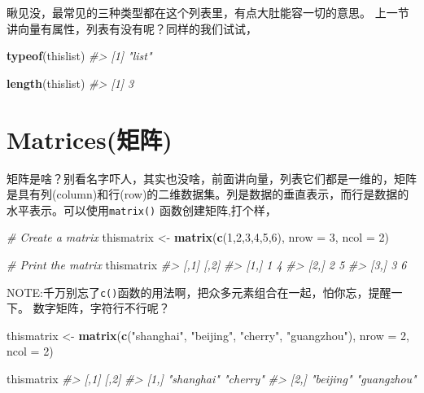 \documentclass[
]{book}
\newenvironment{Shaded}{\begin{snugshade}}{\end{snugshade}}
\newcommand{\AttributeTok}[1]{\textcolor[rgb]{0.13,0.29,0.53}{#1}}
\newcommand{\CommentTok}[1]{\textcolor[rgb]{0.56,0.35,0.01}{\textit{#1}}}
\newcommand{\DecValTok}[1]{\textcolor[rgb]{0.00,0.00,0.81}{#1}}
\newcommand{\FunctionTok}[1]{\textcolor[rgb]{0.13,0.29,0.53}{\textbf{#1}}}
\newcommand{\NormalTok}[1]{#1}
\newcommand{\OtherTok}[1]{\textcolor[rgb]{0.56,0.35,0.01}{#1}}
\newcommand{\StringTok}[1]{\textcolor[rgb]{0.31,0.60,0.02}{#1}}
\begin{document}
瞅见没，最常见的三种类型都在这个列表里，有点大肚能容一切的意思。
上一节讲向量有属性，列表有没有呢？同样的我们试试，

\begin{Shaded}
\begin{Highlighting}[]
\FunctionTok{typeof}\NormalTok{(thislist)}
\CommentTok{\#\textgreater{} [1] "list"}
\end{Highlighting}
\end{Shaded}

\begin{Shaded}
\begin{Highlighting}[]
\FunctionTok{length}\NormalTok{(thislist)}
\CommentTok{\#\textgreater{} [1] 3}
\end{Highlighting}
\end{Shaded}

\hypertarget{matricesux77e9ux9635}{%
\section{Matrices(矩阵)}\label{matricesux77e9ux9635}}

矩阵是啥？别看名字吓人，其实也没啥，前面讲向量，列表它们都是一维的，矩阵是具有列(column)和行(row)的二维数据集。列是数据的垂直表示，而行是数据的水平表示。可以使用\texttt{matrix()} 函数创建矩阵,打个样，

\begin{Shaded}
\begin{Highlighting}[]
\CommentTok{\# Create a matrix}
\NormalTok{thismatrix }\OtherTok{\textless{}{-}} \FunctionTok{matrix}\NormalTok{(}\FunctionTok{c}\NormalTok{(}\DecValTok{1}\NormalTok{,}\DecValTok{2}\NormalTok{,}\DecValTok{3}\NormalTok{,}\DecValTok{4}\NormalTok{,}\DecValTok{5}\NormalTok{,}\DecValTok{6}\NormalTok{), }\AttributeTok{nrow =} \DecValTok{3}\NormalTok{, }\AttributeTok{ncol =} \DecValTok{2}\NormalTok{)}

\CommentTok{\# Print the matrix}
\NormalTok{thismatrix}
\CommentTok{\#\textgreater{}      [,1] [,2]}
\CommentTok{\#\textgreater{} [1,]    1    4}
\CommentTok{\#\textgreater{} [2,]    2    5}
\CommentTok{\#\textgreater{} [3,]    3    6}
\end{Highlighting}
\end{Shaded}

NOTE:千万别忘了\texttt{c()}函数的用法啊，把众多元素组合在一起，怕你忘，提醒一下。
数字矩阵，字符行不行呢？

\begin{Shaded}
\begin{Highlighting}[]
\NormalTok{thismatrix }\OtherTok{\textless{}{-}} \FunctionTok{matrix}\NormalTok{(}\FunctionTok{c}\NormalTok{(}\StringTok{"shanghai"}\NormalTok{, }\StringTok{"beijing"}\NormalTok{, }\StringTok{"cherry"}\NormalTok{, }\StringTok{"guangzhou"}\NormalTok{), }\AttributeTok{nrow =} \DecValTok{2}\NormalTok{, }\AttributeTok{ncol =} \DecValTok{2}\NormalTok{)}

\NormalTok{thismatrix}
\CommentTok{\#\textgreater{}      [,1]       [,2]       }
\CommentTok{\#\textgreater{} [1,] "shanghai" "cherry"   }
\CommentTok{\#\textgreater{} [2,] "beijing"  "guangzhou"}
\end{Highlighting}
\end{Shaded}
\end{document}

